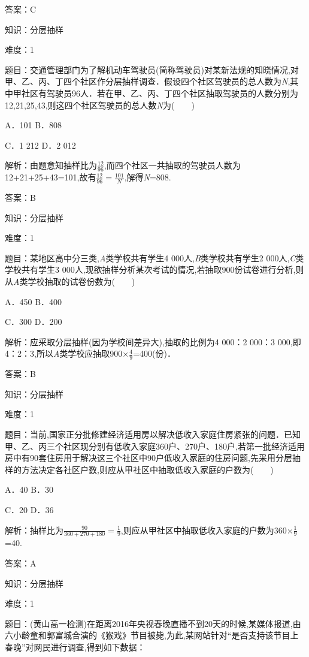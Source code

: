 \documentclass{article} %
\begin{document}
答案：C

知识：分层抽样

难度：1

题目：交通管理部门为了解机动车驾驶员(简称驾驶员)对某新法规的知晓情况,对甲、乙、丙、丁四个社区作分层抽样调查．假设四个社区驾驶员的总人数为\textit{N},其中甲社区有驾驶员96人．若在甲、乙、丙、丁四个社区抽取驾驶员的人数分别为12,21,25,43,则这四个社区驾驶员的总人数\textit{N}为(　　)

A．101    B．808

C．1 212  D．2 012

解析：由题意知抽样比为$\frac{12}{96}$,而四个社区一共抽取的驾驶员人数为12+21+25+43=101,故有$\frac{12}{96}=\frac{101}{N}$,解得\textit{N}=808.

答案：B

知识：分层抽样

难度：1

题目：某地区高中分三类,\textit{A}类学校共有学生4 000人,\textit{B}类学校共有学生2 000人,\textit{C}类学校共有学生3 000人,现欲抽样分析某次考试的情况,若抽取900份试卷进行分析,则从\textit{A}类学校抽取的试卷份数为(　　)

A．450  B．400

C．300  D．200

解析：应采取分层抽样(因为学校间差异大),抽取的比例为4 000：2 000：3 000,即4：2：3,所以\textit{A}类学校应抽取900$\mathrm{\times}\frac{4}{9}$=400(份)．

答案：B

知识：分层抽样

难度：1

题目：当前,国家正分批修建经济适用房以解决低收入家庭住房紧张的问题．已知甲、乙、丙三个社区现分别有低收入家庭360户、270户、180户,若第一批经济适用房中有90套住房用于解决这三个社区中90户低收入家庭的住房问题,先采用分层抽样的方法决定各社区户数,则应从甲社区中抽取低收入家庭的户数为(　　)

A．40  B．30

C．20  D．36

解析：抽样比为$\frac{90}{360+270+180}=\frac{1}{9}$,则应从甲社区中抽取低收入家庭的户数为360$\mathrm{\times}\frac{1}{9}$=40.

答案：A

知识：分层抽样

难度：1

题目：(黄山高一检测)在距离2016年央视春晚直播不到20天的时候,某媒体报道,由六小龄童和郭富城合演的《猴戏》节目被毙,为此,某网站针对``是否支持该节目上春晚''对网民进行调查,得到如下数据：
\end{document}
